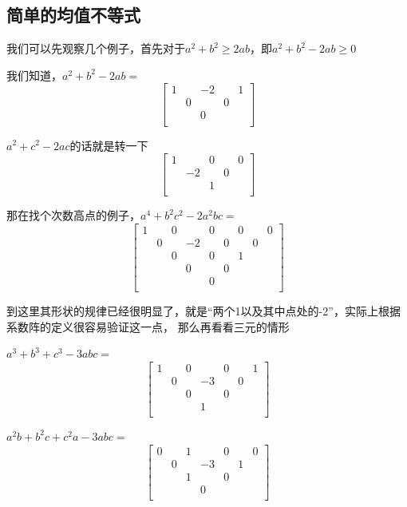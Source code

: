 \documentclass[UTF8]{ctexart}
\begin{document}
\subsection{简单的均值不等式}
我们可以先观察几个例子，首先对于$ a^{2}+b^{2}\geq2ab $，即$ a^{2}+b^{2}-2ab\geq0 $

我们知道，$ a^{2}+b^{2}-2ab= $
\renewcommand*{\arraystretch}{1.732}\[\left[\begin{matrix}
	1& & -2& &1 \\
	& 0& &0 & \\
	& & 0& & \\
\end{matrix}\right]\]

$ a^{2}+c^{2}-2ac $的话就是转一下
\renewcommand*{\arraystretch}{1.732}\[\left[\begin{matrix}
	1& & 0& &0 \\
	& -2& &0 & \\
	& & 1& & \\
\end{matrix}\right]\]

那在找个次数高点的例子，$ a^{4}+b^{2}c^{2}-2a^{2}bc= $
\renewcommand*{\arraystretch}{1.732}\[\left[\begin{matrix}
	1& & 0& &0& & 0& &0\\
    & 0& & -2&&0 & & 0&\\
    & & 0& &0& & 1& &\\
    & & & 0&& 0& & &\\
    & & & &0& & & &\\
\end{matrix}\right]\]

到这里其形状的规律已经很明显了，就是“两个1以及其中点处的-2”，实际上根据系数阵的定义很容易验证这一点，
那么再看看三元的情形

$ a^{3}+b^{3}+c^{3}-3abc= $
\renewcommand*{\arraystretch}{1.732}\[\left[\begin{matrix}
	1& & 0& &0& & 1\\
	& 0& & -3& &0 &\\
	& & 0& &0& & \\
	& & & 1& & &\\
\end{matrix}\right]\]

$ a^{2}b+b^{2}c+c^{2}a-3abc= $
\renewcommand*{\arraystretch}{1.732}\[\left[\begin{matrix}
	0& & 1& &0& & 0\\
	& 0& & -3& &1 &\\
	& & 1& &0& & \\
	& & & 0& & &\\
\end{matrix}\right]\]
\end{document}

